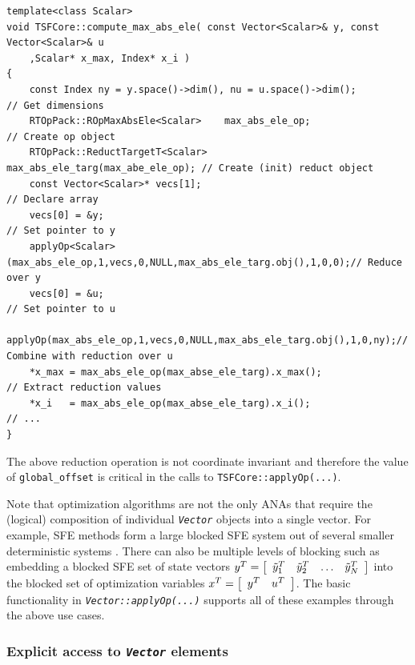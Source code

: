 {\scriptsize\begin{verbatim}
template<class Scalar>
void TSFCore::compute_max_abs_ele( const Vector<Scalar>& y, const Vector<Scalar>& u
    ,Scalar* x_max, Index* x_i )
{
    const Index ny = y.space()->dim(), nu = u.space()->dim();           // Get dimensions
    RTOpPack::ROpMaxAbsEle<Scalar>    max_abs_ele_op;                   // Create op object
    RTOpPack::ReductTargetT<Scalar>   max_abs_ele_targ(max_abe_ele_op); // Create (init) reduct object
    const Vector<Scalar>* vecs[1];                                      // Declare array
    vecs[0] = &y;                                                       // Set pointer to y
    applyOp<Scalar>(max_abs_ele_op,1,vecs,0,NULL,max_abs_ele_targ.obj(),1,0,0);// Reduce over y
    vecs[0] = &u;                                                       // Set pointer to u
    applyOp(max_abs_ele_op,1,vecs,0,NULL,max_abs_ele_targ.obj(),1,0,ny);// Combine with reduction over u
    *x_max = max_abs_ele_op(max_abse_ele_targ).x_max();                 // Extract reduction values
    *x_i   = max_abs_ele_op(max_abse_ele_targ).x_i();                   // ...
}
\end{verbatim}}

\noindent The above reduction operation is not coordinate invariant and
therefore the value of \texttt{global\_offset} is critical in the
calls to \texttt{TSFCore\-::applyOp(\-...)}.

Note that optimization algorithms are not the only ANAs that require
the (logical) composition of individual \texttt{\textit{Vector}}
objects into a single vector.  For example, SFE methods form a large
blocked SFE system out of several smaller deterministic systems
\cite{ref:sfe}.  There can also be multiple levels of blocking such as
embedding a blocked SFE set of state vectors $y^T = \bmat{cccc}
\tilde{y}_1^T & \tilde{y}_2^T & \ldots & \tilde{y}_N^T \emat$ into the blocked set of
optimization variables $x^T = \bmat{cc} y^T & u^T \emat$.  The basic
functionality in \texttt{\textit{Vector\-::applyOp(\-...)}} supports
all of these examples through the above use cases.

%
\subsubsection{Explicit access to \texttt{\textit{Vector}} elements}
\label{tsfcore:sec:explicit_vec_access}
%

